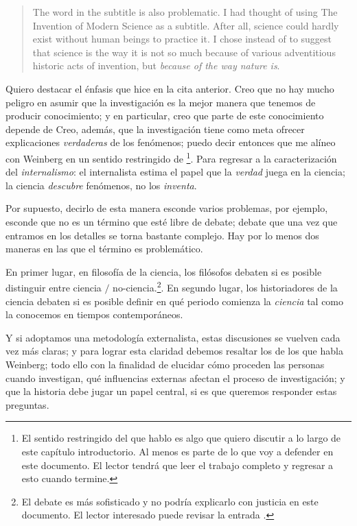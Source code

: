 	\begin{quote}
		The word  in the subtitle is also problematic.
		I had thought of using The Invention of Modern Science as a subtitle.
		After all, science could hardly exist without human beings to practice it.
		I chose  instead of  to suggest that science is the way it is not so much because of various adventitious 		historic acts of invention, but \emph{because of the way nature is}. \parencite[Prefacio, énfasis agregado]{Weinberg2015}
	\end{quote}

Quiero destacar el énfasis que hice en la cita anterior.
Creo que no hay mucho peligro en asumir que la investigación es la mejor manera que tenemos de producir conocimiento; y en particular, creo que parte de este conocimiento depende de 
Creo, además, que la investigación tiene como meta ofrecer explicaciones \emph{verdaderas} de los fenómenos; puedo decir entonces que me alíneo con Weinberg en un sentido restringido de \footnote{
	El sentido restringido del que hablo es algo que quiero discutir a lo largo de este capítulo introductorio. Al menos es parte de lo que voy a defender en este documento.
	El lector tendrá que leer el trabajo completo y regresar a esto cuando termine.}.
Para regresar a la caracterización del \emph{internalismo}: el internalista estima el papel que la \emph{verdad} juega en la ciencia; la ciencia \emph{descubre} fenómenos, no los \emph{inventa}.

Por supuesto, decirlo de esta manera esconde varios problemas, por ejemplo, esconde que  no es un término que esté libre de debate; debate que una vez que entramos en los detalles se torna bastante complejo.
Hay por lo menos dos maneras en las que el término es problemático.

En primer lugar, en filosofía de la ciencia, los filósofos debaten si es posible distinguir entre ciencia $/$ no-ciencia.\footnote{El debate es más sofisticado y no podría explicarlo con justicia en este documento.
	El lector interesado puede revisar la entrada \parencite{sep-pseudo-science}.}.
En segundo lugar, los historiadores de la ciencia debaten si es posible definir en qué periodo comienza la \emph{ciencia} tal como la conocemos en tiempos contemporáneos.

Y si adoptamos una metodología externalista, estas discusiones se vuelven cada vez más claras; y para lograr esta claridad debemos resaltar los  de los que habla Weinberg; todo ello con la finalidad de elucidar cómo proceden las personas cuando investigan, qué influencias externas afectan el proceso de investigación; y que la historia debe jugar un papel central, si es que queremos responder estas preguntas.

